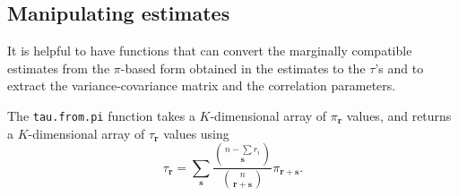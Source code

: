 \documentclass[reqno]{amsart}
\newcommand{\rvec}{\mathbf{r}}
\newcommand{\svec}{\mathbf{s}}
\begin{document}
\subsection{Manipulating estimates}
It is helpful to have functions that can convert the marginally compatible estimates from the $\pi$-based
form obtained in the estimates to the $\tau$'s and to extract the variance-covariance matrix and the 
correlation parameters.

The \texttt{tau.from.pi} function takes a $K$-dimensional array of $\pi_\rvec$ values, and returns a $K$-dimensional
array of $\tau_\rvec$ values using
\begin{equation} 
 \tau_\rvec = \sum_{\svec}\frac{\binom{n-\sum r_i}{\svec}}%
  {\binom{n}{\rvec+\svec}}\pi_{\rvec+\svec}.%
\end{equation}
\end{document}
